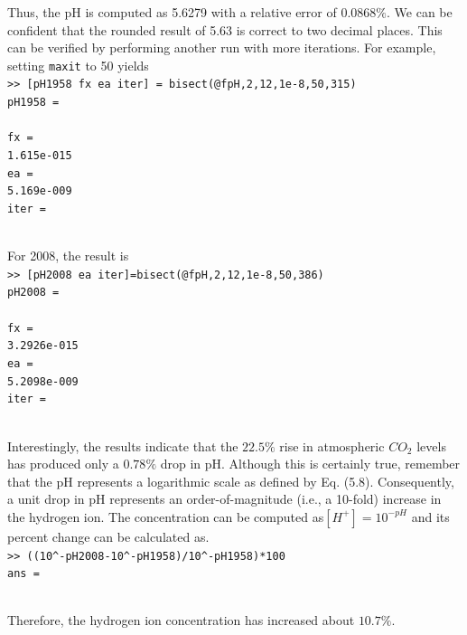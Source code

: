 \documentclass[../main.tex]{subfiles}
\begin{document}
\noindent Thus, the pH is computed as 5.6279 with a relative error of $0.0868\%$. We can be confident
that the rounded result of 5.63 is correct to two decimal places. This can be verified by performing
another run with more iterations. For example, setting \texttt{maxit} to 50 yields\\

\texttt{>> [pH1958 fx ea iter] = bisect(@fpH,2,12,1e-8,50,315)\\
\indent pH1958 =\\
\indent{}\\
\indent fx =\\
\indent\indent 1.615e-015\\
\indent ea =\\
\indent\indent 5.169e-009\\
\indent iter =\\
\\}

\noindent For 2008, the result is\\

\texttt{>> [pH2008 ea iter]=bisect(@fpH,2,12,1e-8,50,386)\\
\indent pH2008 =\\
\indent{}\\
\indent fx =\\
\indent\indent 3.2926e-015\\
\indent ea =\\
\indent\indent 5.2098e-009\\
\indent iter =\\
\indent{}\\}

Interestingly, the results indicate that the $22.5\%$ rise in atmospheric $CO_2$ levels has
produced only a $0.78\%$ drop in pH. Although this is certainly true, remember that the pH
represents a logarithmic scale as defined by Eq. (5.8). Consequently, a unit drop in pH represents
an order-of-magnitude (i.e., a 10-fold) increase in the hydrogen ion. The concentration
can be computed as$ [H^+] = 10^{-pH}$ and its percent change can be calculated as.\\

\texttt{>> ((10\textasciicircum-pH2008-10\textasciicircum-pH1958)/10\textasciicircum-pH1958)*100\\
\indent ans =\\
\indent{}\\}

\noindent Therefore, the hydrogen ion concentration has increased about $10.7\%$.
\end{document}
